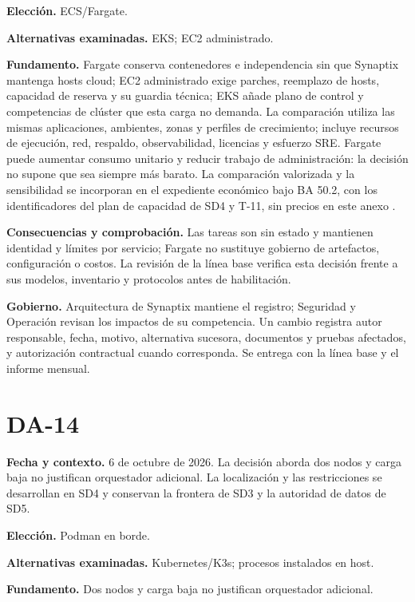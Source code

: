 \documentclass[11pt,letterpaper]{report}
\begin{document}
\textbf{Elección.} ECS/Fargate.

\textbf{Alternativas examinadas.} EKS; EC2 administrado.

\textbf{Fundamento.} Fargate conserva contenedores e independencia sin que Synaptix mantenga hosts cloud; EC2 administrado exige parches, reemplazo de hosts, capacidad de reserva y su guardia técnica; EKS añade plano de control y competencias de clúster que esta carga no demanda. La comparación utiliza las mismas aplicaciones, ambientes, zonas y perfiles de crecimiento; incluye recursos de ejecución, red, respaldo, observabilidad, licencias y esfuerzo SRE. Fargate puede aumentar consumo unitario y reducir trabajo de administración: la decisión no supone que sea siempre más barato. La comparación valorizada y la sensibilidad se incorporan en el expediente económico bajo BA 50.2, con los identificadores del plan de capacidad de SD4 y T-11, sin precios en este anexo \parencites[RT-03.05, p.~8; RT-03.09, p.~9]{pucv-transversal}[art.~50.2, p.~29]{pucv-admin}.

\textbf{Consecuencias y comprobación.} Las tareas son sin estado y mantienen identidad y límites por servicio; Fargate no sustituye gobierno de artefactos, configuración o costos. La revisión de la línea base verifica esta decisión frente a sus modelos, inventario y protocolos antes de habilitación.

\textbf{Gobierno.} Arquitectura de Synaptix mantiene el registro; Seguridad y Operación revisan los impactos de su competencia. Un cambio registra autor responsable, fecha, motivo, alternativa sucesora, documentos y pruebas afectados, y autorización contractual cuando corresponda. Se entrega con la línea base y el informe mensual.

\section*{DA-14}

\textbf{Fecha y contexto.} 6 de octubre de 2026. La decisión aborda dos nodos y carga baja no justifican orquestador adicional. La localización y las restricciones se desarrollan en SD4 y conservan la frontera de SD3 y la autoridad de datos de SD5.

\textbf{Elección.} Podman en borde.

\textbf{Alternativas examinadas.} Kubernetes/K3s; procesos instalados en host.

\textbf{Fundamento.} Dos nodos y carga baja no justifican orquestador adicional.
\end{document}
